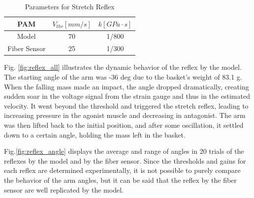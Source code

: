 \begin{table}[h]
    \centering
    \caption{Parameters for Stretch Reflex} 
    \begin{tabular}{c|cc}
        \hline
        PAM &$V_{thr} [\si{mm/s}]$&$ k [\si{GPa\cdot s}]$\\
        \hline \hline
        Model & 70 & 1/800\\
        Fiber Sensor & 25 & 1/300\\
        \hline
    \end{tabular}
\label{tab:reflex_para}
\end{table}

Fig. \ref{fig:reflex_all} illustrates the dynamic behavior of the reflex by the model. The starting angle of the arm was -36 deg due to the basket's weight of 83.1 g. When the falling mass made an impact, the angle dropped dramatically, creating sudden soar in the voltage signal from the strain gauge and thus in the estimated velocity. It went beyond the threshold and triggered the stretch reflex, leading to increasing pressure in the agonist muscle and decreasing in antagonist. The arm was then lifted back to the initial position, and after some oscillation, it settled down to a certain angle, holding the mass left in the basket.


Fig.\ref{fig:reflex_angle} displays the average and range of angles in 20 trials of the reflexes by the model and by the fiber sensor. Since the thresholds and gains for each reflex are determined experimentally, it is not possible to purely compare the behavior of the arm angles, but it can be said that the reflex by the fiber sensor are well replicated by the model.


